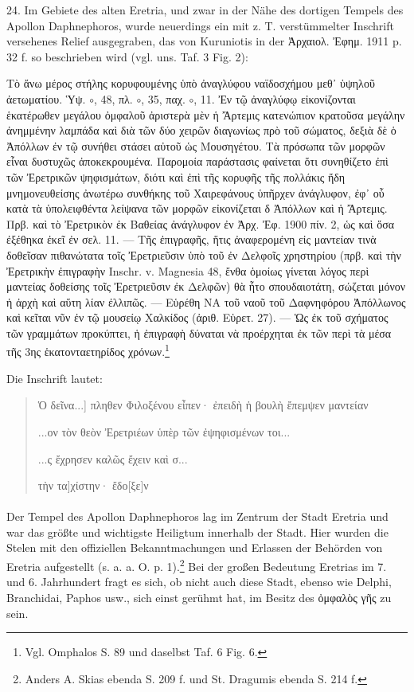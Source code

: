 \documentclass[a4paper, 11pt, oneside]{article}
\begin{document}
24. Im Gebiete des alten Eretria, und zwar in der Nähe des dortigen Tempels des Apollon Daphnephoros, wurde neuerdings ein mit z. T. verstümmelter Inschrift versehenes Relief ausgegraben, das von Kuruniotis in der Ἀρχαιολ. Ἐφημ. 1911 p. 32 f. so beschrieben wird (vgl. uns. Taf. 3 Fig. 2):

Τὸ ἄνω μέρος στήλης κορυφουμένης ὑπὸ ἀναγλύφου ναϊδοσχήμου μεθ᾽ ὑψηλοῦ ἀετωματίου. Ὑψ. $\circ$, 48, πλ. $\circ$, 35, παχ. $\circ$, 11. Ἐν τῷ ἀναγλύφῳ εἰκονίζονται ἑκατέρωθεν μεγάλου ὀμφαλοῦ ἀριστερὰ μὲν ἡ Ἄρτεμις κατενώπιον κρατοῦσα μεγάλην ἀνημμένην λαμπάδα καὶ διὰ τῶν δύο χειρῶν διαγωνίως πρὸ τοῦ σώματος, δεξιὰ δὲ ὁ Ἀπόλλων ἐν τῷ συνήθει στάσει αὐτοῦ ὡς Μουσηγέτου. Τὰ πρόσωπα τῶν μορφῶν εἶναι δυστυχῶς ἀποκεκρουμένα. Παρομοία παράστασις φαίνεται ὅτι συνηθίζετο ἐπὶ τῶν Ἐρετρικῶν ψηφισμάτων, διότι καὶ ἐπὶ τῆς κορυφῆς τῆς πολλάκις ἤδη μνημονευθείσης ἀνωτέρω συνθήκης τοῦ Χαιρεφάνους ὑπῆρχεν ἀνάγλυφον, ἐφ᾽ οὗ κατὰ τὰ ὑπολειφθέντα λείψανα τῶν μορφῶν εἰκονίζεται δ Ἀπόλλων καὶ ἡ Ἄρτεμις. Πρβ. καὶ τὸ Ἐρετρικὸν ἐκ Βαθείας ἀνάγλυφον ἐν Ἀρχ. Ἐφ. 1900 πίν. 2, ὡς καὶ ὅσα ἐξέθηκα ἐκεῖ ἐν σελ. 11. --- Τῆς ἐπιγραφῆς, ἥτις ἀναφερομένη εἰς μαντείαν τινὰ δοθεῖσαν πιθανώτατα τοῖς Ἐρετριεῦσιν ὑπὸ τοῦ ἐν Δελφοῖς χρηστηρίου (πρβ. καὶ τὴν Ἐρετρικὴν ἐπιγραφὴν Inschr. v. Magnesia 48, ἔνθα ὁμοίως γίνεται λόγος περὶ μαντείας δοθείσης τοῖς Ἐρετριεῦσιν ἐκ Δελφῶν) θὰ ἦτο σπουδαιοτάτη, σώζεται μόνον ἡ ἀρχὴ καὶ αὕτη λίαν ἐλλιπῶς. --- Εὑρέθη ΝΑ τοῦ ναοῦ τοῦ Δαφνηφόρου Ἀπόλλωνος καὶ κεῖται νῦν ἐν τῷ μουσείῳ Χαλκίδος (ἀριθ. Εὑρετ. 27). --- Ὡς ἐκ τοῦ σχήματος τῶν γραμμάτων προκύπτει, ἡ ἐπιγραφὴ δύναται νὰ προέρχηται ἐκ τῶν περὶ τὰ μέσα τῆς 3ης ἑκατονταετηρίδος χρόνων.\footnote{Vgl. Omphalos S. 89 und daselbst Taf. 6 Fig. 6.}

Die Inschrift lautet:
\begin{quotation}
Ὁ δεῖνα...] πληθεν Φιλοξένου εἶπεν· ἐπειδὴ ἡ βουλὴ ἔπεμψεν μαντείαν

\hspace*{5mm}...ον τὸν θεὸν Ἐρετριέων ὑπὲρ τῶν ἐψηφισμένων τοι...

\hspace*{10mm}...ς ἔχρησεν καλῶς ἔχειν καὶ σ...

\hspace*{15mm}τὴν τα]χίστην· ἔδο[ξε]ν
\end{quotation}
\paragraph{}
Der Tempel des Apollon Daphnephoros lag im Zentrum der Stadt Eretria und war das größte und wichtigste Heiligtum innerhalb der Stadt. Hier wurden die Stelen mit den offiziellen Bekanntmachungen und Erlassen der Behörden von Eretria aufgestellt (s. a. a. O. p. 1).\footnote{Anders A. Skias ebenda S. 209 f. und St. Dragumis ebenda S. 214 f.} Bei der großen Bedeutung Eretrias im 7. und 6. Jahrhundert fragt es sich, ob nicht auch diese Stadt, ebenso wie Delphi, Branchidai, Paphos usw., sich einst gerühmt hat, im Besitz des ὀμφαλὸς γῆς zu sein.
\end{document}
